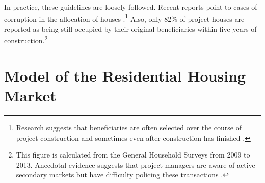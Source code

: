 \documentclass[12pt]{article}
\begin{document}
In practice, these guidelines are loosely followed.  Recent reports point to cases of corruption in the allocation of houses \citep{seriq}.\footnote{Research suggests that beneficiaries are often selected over the course of project construction and sometimes even after construction has finished \citep{seriq}.}  Also, only 82\% of project houses are reported as being still occupied by their original beneficiaries within five years of construction.\footnote{This figure is calculated from the General Household Surveys from 2009 to 2013. Anecdotal evidence suggests that project managers are aware of active secondary markets but have difficulty policing these transactions \citep{resale}.} 





\section{Model of the Residential Housing Market}\label{section:theory}
\end{document}
